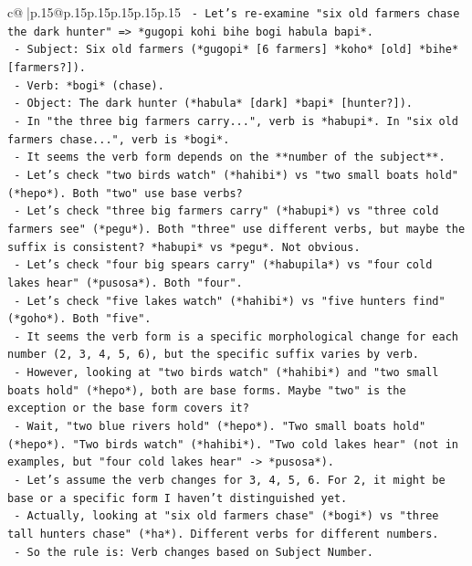 \documentclass{article}
\begin{document}
{\begin{supertabular}{c@{$\;$}|p{.15\linewidth}@{}p{.15\linewidth}p{.15\linewidth}p{.15\linewidth}p{.15\linewidth}p{.15\linewidth}}
{{{\texttt{    {-} Let's re{-}examine "six old farmers chase the dark hunter" => *gugopi kohi bihe bogi habula bapi*.} \\
\texttt{      {-} Subject: Six old farmers (*gugopi* {[}6 farmers{]} *koho* {[}old{]} *bihe* {[}farmers?{]}).} \\
\texttt{      {-} Verb: *bogi* (chase).} \\
\texttt{      {-} Object: The dark hunter (*habula* {[}dark{]} *bapi* {[}hunter?{]}).} \\
\texttt{      {-} In "the three big farmers carry...", verb is *habupi*. In "six old farmers chase...", verb is *bogi*.} \\
\texttt{      {-} It seems the verb form depends on the **number of the subject**.} \\
\texttt{      {-} Let's check "two birds watch" (*hahibi*) vs "two small boats hold" (*hepo*). Both "two" use base verbs?} \\
\texttt{      {-} Let's check "three big farmers carry" (*habupi*) vs "three cold farmers see" (*pegu*). Both "three" use different verbs, but maybe the suffix is consistent? *habupi* vs *pegu*. Not obvious.} \\
\texttt{      {-} Let's check "four big spears carry" (*habupila*) vs "four cold lakes hear" (*pusosa*). Both "four".} \\
\texttt{      {-} Let's check "five lakes watch" (*hahibi*) vs "five hunters find" (*goho*). Both "five".} \\
\texttt{      {-} It seems the verb form is a specific morphological change for each number (2, 3, 4, 5, 6), but the specific suffix varies by verb.} \\
\texttt{      {-} However, looking at "two birds watch" (*hahibi*) and "two small boats hold" (*hepo*), both are base forms. Maybe "two" is the exception or the base form covers it?} \\
\texttt{      {-} Wait, "two blue rivers hold" (*hepo*). "Two small boats hold" (*hepo*). "Two birds watch" (*hahibi*). "Two cold lakes hear" (not in examples, but "four cold lakes hear" {-}> *pusosa*).} \\
\texttt{      {-} Let's assume the verb changes for 3, 4, 5, 6. For 2, it might be base or a specific form I haven't distinguished yet.} \\
\texttt{      {-} Actually, looking at "six old farmers chase" (*bogi*) vs "three tall hunters chase" (*ha*). Different verbs for different numbers.} \\
\texttt{      {-} So the rule is: Verb changes based on Subject Number.} \\
}}}
\end{supertabular}}
\end{document}
